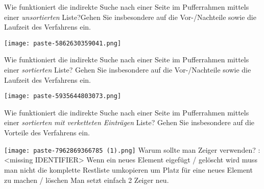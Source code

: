 \documentclass{article}
\begin{document}
\begin{tcolorbox}[colback=white!10!white,colframe=lightgray!75!black,
  savelowerto=\jobname_ex.tex]

\begin{center}
 Wie funktioniert die indirekte Suche nach einer Seite im Pufferrahmen mittels einer 
\textit{unsortierten
} Liste?Gehen Sie insbesondere auf die Vor-/Nachteile sowie die Laufzeit des Verfahrens ein. 

\end{center}

\tcblower

\justifying
\texttt{[image: paste-5862630359041.png]}

\end{tcolorbox}
\begin{tcolorbox}[colback=white!10!white,colframe=lightgray!75!black,
  savelowerto=\jobname_ex.tex]

\begin{center}
 Wie funktioniert die indirekte Suche nach einer Seite im Pufferrahmen mittels einer
\textit{sortierten
} Liste? Gehen Sie insbesondere auf die Vor-/Nachteile sowie die Laufzeit des Verfahrens ein. 

\end{center}

\tcblower

\justifying
\texttt{[image: paste-5935644803073.png]}

\end{tcolorbox}
\begin{tcolorbox}[colback=white!10!white,colframe=lightgray!75!black,
  savelowerto=\jobname_ex.tex]

\begin{center}
 Wie funktioniert die indirekte Suche nach einer Seite im Pufferrahmen mittels einer
\textit{sortierten
}\textit{mit verketteten Einträgen
}Liste? Gehen Sie insbesondere auf die Vorteile des Verfahrens ein. 

\end{center}

\tcblower

\justifying
\texttt{[image: paste-7962869366785 (1).png]}
Warum sollte man Zeiger verwenden?
:<missing IDENTIFIER>
Wenn ein neues Element eigefügt / gelöscht wird muss man nicht die komplette Restliste umkopieren um Platz für eine neues Element zu machen / löschen  Man setzt einfach 2 Zeiger neu.

\end{tcolorbox}
\end{document}
